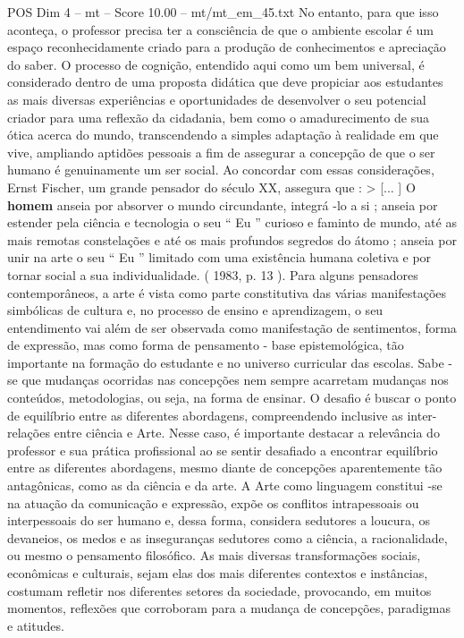 \begin{textsample}{POS Dim 4 – mt – Score 10.00 – mt/mt\_em\_45.txt}
No entanto, para que isso aconteça, o professor precisa ter a consciência de que o ambiente escolar é um espaço reconhecidamente criado para a produção de conhecimentos e apreciação do saber.
O processo de cognição, entendido aqui como um bem universal, é considerado dentro de uma proposta didática que deve propiciar aos estudantes as mais diversas experiências e oportunidades de desenvolver o seu potencial criador para uma reflexão da cidadania, bem como o amadurecimento de sua ótica acerca do mundo, transcendendo a simples adaptação à realidade em que vive, ampliando aptidões pessoais a fim de assegurar a concepção de que o ser humano é genuinamente um ser social.
Ao concordar com essas considerações, Ernst Fischer, um grande pensador do século XX, assegura que : > [... ] O \textbf{homem} anseia por absorver o mundo circundante, integrá -lo a si ; anseia por estender pela ciência e tecnologia o seu “ Eu ” curioso e faminto de mundo, até as mais remotas constelações e até os mais profundos segredos do átomo ; anseia por unir na arte o seu “ Eu ” limitado com uma existência humana coletiva e por tornar social a sua individualidade. ( 1983, p. 13 ).
Para alguns pensadores contemporâneos, a arte é vista como parte constitutiva das várias manifestações simbólicas de cultura e, no processo de ensino e aprendizagem, o seu entendimento vai além de ser observada como manifestação de sentimentos, forma de expressão, mas como forma de pensamento - base epistemológica, tão importante na formação do estudante e no universo curricular das escolas.
Sabe -se que mudanças ocorridas nas concepções nem sempre acarretam mudanças nos conteúdos, metodologias, ou seja, na forma de ensinar.
O desafio é buscar o ponto de equilíbrio entre as diferentes abordagens, compreendendo inclusive as inter-relações entre ciência e Arte.
Nesse caso, é importante destacar a relevância do professor e sua prática profissional ao se sentir desafiado a encontrar equilíbrio entre as diferentes abordagens, mesmo diante de concepções aparentemente tão antagônicas, como as da ciência e da arte.
A Arte como linguagem constitui -se na atuação da comunicação e expressão, expõe os conflitos intrapessoais ou interpessoais do ser humano e, dessa forma, considera sedutores a loucura, os devaneios, os medos e as inseguranças sedutores como a ciência, a racionalidade, ou mesmo o pensamento filosófico.
As mais diversas transformações sociais, econômicas e culturais, sejam elas dos mais diferentes contextos e instâncias, costumam refletir nos diferentes setores da sociedade, provocando, em muitos momentos, reflexões que corroboram para a mudança de concepções, paradigmas e atitudes.

\end{textsample}
